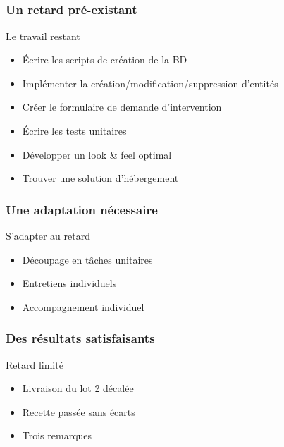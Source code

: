 \speaker{\Pierre{}}
\subsection{} %

\begin{frame}
\frametitle{Un retard pré-existant}
\begin{block}{Le travail restant}
\begin{itemize}
	\item Écrire les scripts de création de la BD
	\item Implémenter la création/modification/suppression d'entités
	\item Créer le formulaire de demande d'intervention
	\item Écrire les tests unitaires
	\item Développer un look \& feel optimal
	\item Trouver une solution d’hébergement
\end{itemize}
\end{block}
\end{frame}


\begin{frame}
\frametitle{Une adaptation nécessaire}
\begin{block}{S'adapter au retard}
\begin{itemize}
	\item Découpage en tâches unitaires
	\item Entretiens individuels
	\item Accompagnement individuel
\end{itemize}
\end{block}
\end{frame}


\begin{frame}
\frametitle{Des résultats satisfaisants}
\begin{block}{Retard limité}
\begin{itemize}
	\item Livraison du lot 2 décalée
	\item Recette passée sans écarts
	\item Trois remarques
\end{itemize}
\end{block}
\end{frame}


